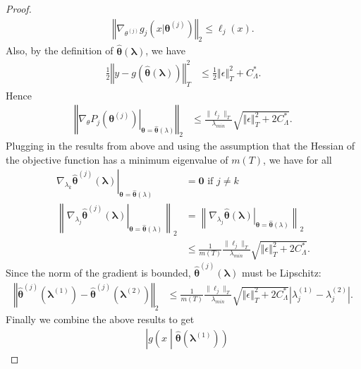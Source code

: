 \documentclass[10pt]{book}
\theoremstyle{definition}
\begin{document}
\begin{proof}
\begin{align}
	\left\Vert
	\nabla_{\theta^{(j)}}g_{j}(x|\boldsymbol{\theta}^{(j)})
	\right\Vert_{2}
	\le \ell_j(x).
	\end{align}
	Also, by the definition of $\hat{\boldsymbol{\theta}}(\boldsymbol{\lambda})$, we have
	\begin{align}
	\frac{1}{2}\left\Vert y-g(\hat{\boldsymbol{\theta}}(\boldsymbol{\lambda}))\right\Vert _{T}^{2}
	& \le \frac{1}{2}\left\Vert \epsilon \right \Vert_T^2 + C^*_{\Lambda}.
	\end{align}
	Hence
	\begin{align}
	\left\Vert \left.\nabla_{\theta}P_{j}(\boldsymbol{\theta}^{(j)})\right|_{\boldsymbol{\theta}=\hat{\boldsymbol{\theta}}(\lambda)}\right\Vert_2
	& \le \frac{\|\ell_j\|_T}{\lambda_{min}}
	\sqrt{\left\Vert \epsilon \right \Vert_T^2 + 2 C^*_{\Lambda}}.
	\end{align}
	Plugging in the results from above and using the assumption that the Hessian of the objective function has a minimum eigenvalue of $m(T)$, we have for all 
	\begin{align}
	\left .
	\nabla_{\lambda_k}\hat{\boldsymbol{\theta}}^{(j)}(\boldsymbol{\lambda})
	\right|_{\boldsymbol{\theta}=\hat{\boldsymbol{\theta}}(\lambda)}
	& = \boldsymbol{0}
	\text{ if } j\ne k
	\\
	\left \|
	\left .
	\nabla_{\lambda_j}\hat{\boldsymbol{\theta}}^{(j)}(\boldsymbol{\lambda})
	\right|_{\boldsymbol{\theta}=\hat{\boldsymbol{\theta}}(\lambda)}
	\right \|_2
	& = \left \|
	\left .
	\nabla_{\lambda_j}\hat{\boldsymbol{\theta}}(\boldsymbol{\lambda})
	\right|_{\boldsymbol{\theta}=\hat{\boldsymbol{\theta}}(\lambda)}
	\right \|_2
	\\
	& \le \frac{1}{m(T)} \frac{\|\ell_j\|_T}{\lambda_{min}}
	\sqrt{\left\Vert \epsilon \right \Vert_T^2 + 2 C^*_{\Lambda}}.
	\end{align}
	Since the norm of the gradient is bounded, $\hat{\boldsymbol{\theta}}^{(j)}(\boldsymbol{\lambda})$ must be Lipschitz:
	\begin{align}
	\left\Vert \hat{\boldsymbol{\theta}}^{(j)}(\boldsymbol{\lambda}^{(1)})
	-\hat{\boldsymbol{\theta}}^{(j)}(\boldsymbol{\lambda}^{(2)})\right\Vert _{2}
	& \le
	\frac{1}{m(T)} \frac{\|\ell_j\|_T}{\lambda_{min}}
	\sqrt{\left\Vert \epsilon \right \Vert_T^2 + 2 C^*_{\Lambda}}
	\left |{\lambda}^{(1)}_j-{\lambda}^{(2)}_j \right |.
	\label{eq:lipschitz_params}
	\end{align}
	Finally we combine the above results to get
	\begin{align}
	& \left |
	g \left (x \middle | \hat{\boldsymbol{\theta}}(\boldsymbol{\lambda}^{(1)})\right )

\end{align}
\end{proof}
\end{document}
